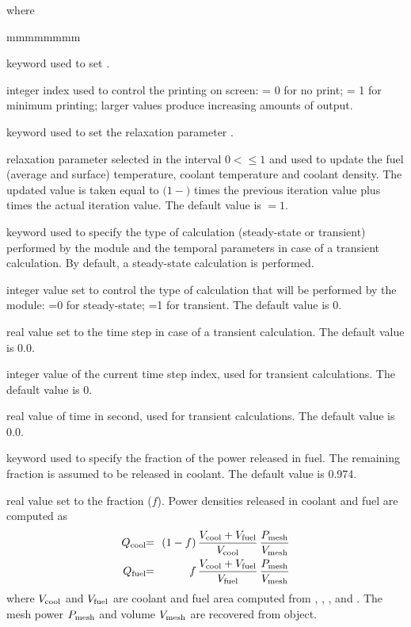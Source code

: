 \noindent where
\begin{ListeDeDescription}{mmmmmmmm}

\item[\moc{EDIT}] keyword used to set .

\item[\dusa{iprint}] integer index used to control the printing on screen:
= 0 for no print; = 1 for minimum printing; larger values produce
increasing amounts of output.

\item[\moc{RELAX}] keyword used to set the relaxation parameter .

\item[\dusa{relax}] relaxation parameter selected in the interval $0<$$\le 1$ and used to update
the fuel (average and surface) temperature, coolant temperature and coolant density. The updated value is taken equal to
$(1-$$)$ times the previous iteration value plus  times the actual iteration value. The default
value is $=1$.

\item[\moc{TIME}] keyword used to specify the type of calculation (steady-state or transient) performed by the  module and the temporal parameters in case of a transient calculation. By
default, a steady-state calculation is performed.
\item[\dusa{caltype}] integer value set to control the type of calculation that will be performed by the  module: =0 for steady-state; =1 for transient. The default value is 0.
\item[\dusa{timestep}] real value set to the time step in case of a transient calculation. The default value is 0.0.
\item[\dusa{timeiter}] integer value of the current time step index, used for transient calculations. The default value is 0.
\item[\dusa{time}] real value of time in second, used for transient calculations. The default value is 0.0.

\item[\moc{FPUISS}] keyword used to specify the fraction of the power released in fuel. The remaining
fraction is assumed to be released in coolant. The default value is 0.974.

\item[\dusa{fract}] real value set to the fraction ($f$). Power densities released in coolant and
fuel are computed as
\begin{eqnarray*}
Q_{\rm cool} \negthinspace\negthinspace &=& \negthinspace\negthinspace (1-f)\, {V_{\rm cool}+V_{\rm fuel} \over V_{\rm cool}} \, {P_{\rm mesh} \over
V_{\rm mesh}} \\
Q_{\rm fuel} \negthinspace\negthinspace &=& \negthinspace\negthinspace f\, {V_{\rm cool}+V_{\rm fuel} \over V_{\rm fuel}} \, {P_{\rm mesh} \over
V_{\rm mesh}}
\end{eqnarray*}
\noindent where $V_{\rm cool}$ and $V_{\rm fuel}$ are coolant and fuel area computed from
, , ,  and . The mesh power $P_{\rm mesh}$ and
volume $V_{\rm mesh}$ are recovered from  object.


\end{ListeDeDescription}
